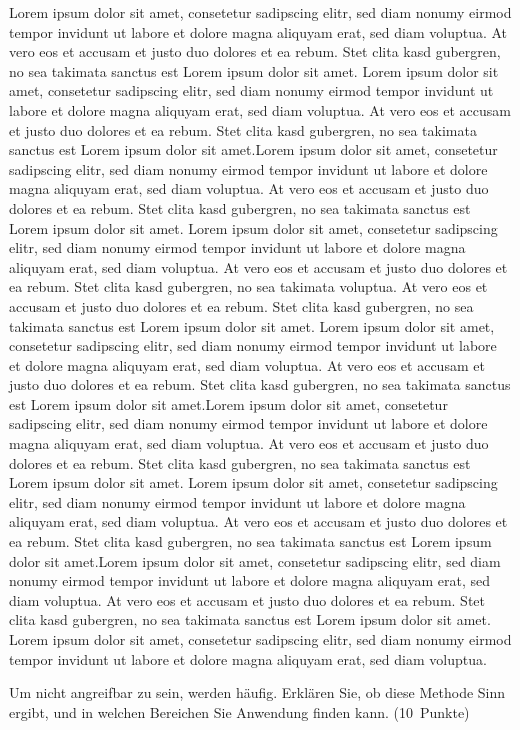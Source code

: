 \documentclass[addpoints,a4paper,ngerman,10pt,answers]{exam}
\begin{document}
\begin{questions}
\ifprintanswers
\begin{minipage}{0.7\textwidth}
\begin{solution}
\parbox[t][][t]{0.8\textwidth}{Lorem ipsum dolor sit amet, consetetur sadipscing elitr, sed diam nonumy eirmod tempor invidunt ut labore et dolore magna aliquyam erat, sed diam voluptua. At vero eos et accusam et justo duo dolores et ea rebum. Stet clita kasd gubergren, no sea takimata sanctus est Lorem ipsum dolor sit amet. Lorem ipsum dolor sit amet, consetetur sadipscing elitr, sed diam nonumy eirmod tempor invidunt ut labore et dolore magna aliquyam erat, sed diam voluptua. At vero eos et accusam et justo duo dolores et ea rebum. Stet clita kasd gubergren, no sea takimata sanctus est Lorem ipsum dolor sit amet.Lorem ipsum dolor sit amet, consetetur sadipscing elitr, sed diam nonumy eirmod tempor invidunt ut labore et dolore magna aliquyam erat, sed diam voluptua. At vero eos et accusam et justo duo dolores et ea rebum. Stet clita kasd gubergren, no sea takimata sanctus est Lorem ipsum dolor sit amet. Lorem ipsum dolor sit amet, consetetur sadipscing elitr, sed diam nonumy eirmod tempor invidunt ut labore et dolore magna aliquyam erat, sed diam voluptua. At vero eos et accusam et justo duo dolores et ea rebum. Stet clita kasd gubergren, no sea takimata  voluptua. At vero eos et accusam et justo duo dolores et ea rebum. Stet clita kasd gubergren, no sea takimata sanctus est Lorem ipsum dolor sit amet. Lorem ipsum dolor sit amet, consetetur sadipscing elitr, sed diam nonumy eirmod tempor invidunt ut labore et dolore magna aliquyam erat, sed diam voluptua. At vero eos et accusam et justo duo dolores et ea rebum. Stet clita kasd gubergren, no sea takimata sanctus est Lorem ipsum dolor sit amet.Lorem ipsum dolor sit amet, consetetur sadipscing elitr, sed diam nonumy eirmod tempor invidunt ut labore et dolore magna aliquyam erat, sed diam voluptua. At vero eos et accusam et justo duo dolores et ea rebum. Stet clita kasd gubergren, no sea takimata sanctus est Lorem ipsum dolor sit amet. Lorem ipsum dolor sit amet, consetetur sadipscing elitr, sed diam nonumy eirmod tempor invidunt ut labore et dolore magna aliquyam erat, sed diam voluptua. At vero eos et accusam et justo duo dolores et ea rebum. Stet clita kasd gubergren, no sea takimata sanctus est Lorem ipsum dolor sit amet.Lorem ipsum dolor sit amet, consetetur sadipscing elitr, sed diam nonumy eirmod tempor invidunt ut labore et dolore magna aliquyam erat, sed diam voluptua. At vero eos et accusam et justo duo dolores et ea rebum. Stet clita kasd gubergren, no sea takimata sanctus est Lorem ipsum dolor sit amet. Lorem ipsum dolor sit amet, consetetur sadipscing elitr, sed diam nonumy eirmod tempor invidunt ut labore et dolore magna aliquyam erat, sed diam voluptua. }
\end{solution}
\end{minipage}
\else
{}
\fi
\vspace{1cm}
\question[10] \parbox[t][][t]{0.68\textwidth}{Um nicht angreifbar zu sein, werden häufig. Erklären Sie, ob diese Methode Sinn ergibt, und in welchen Bereichen Sie Anwendung finden kann. 
\linebreak(10\ Punkte)}


\end{questions}
\end{document}
